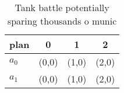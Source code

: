 \documentclass[a4paper]{article}
\begin{document}
\begin{table}
\begin{adjustbox}{width=0.9\columnwidth}
\begin{tabular}{|l|l|l|l|}
\hline
\textbf{plan} & \multicolumn{1}{c|}{\textbf{0}} & \multicolumn{1}{c|}{\textbf{1}} & \multicolumn{1}{c|}{\textbf{2}} \\ \hline
\textbf{$a_0$}  & (0,0) & (1,0) & (2,0) \\ \hline
\textbf{$a_1$}  & (0,0) & (1,0) & (2,0) \\ \hline
\end{tabular}
\end{adjustbox}
\caption{Tank battle potentially sparing thousands o munic
}
\end{table}
\end{document}
